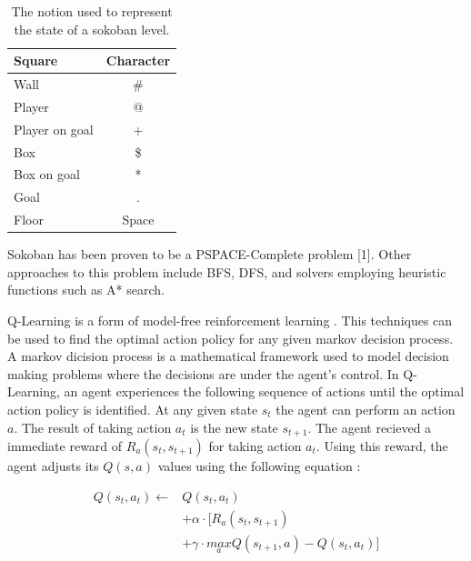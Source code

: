 \documentclass[times, 10pt,twocolumn]{article}
\begin{document}
\begin{table}[htbp]
  \centering
  \begin{tabular}{l c} \hline\hline
    Square & Character \\ \hline
    Wall & \# \\
    Player & @ \\
    Player on goal & + \\
    Box & \$ \\
    Box on goal & * \\
    Goal & . \\
    Floor & Space \\ \hline\hline
  \end{tabular}
  \caption{The notion used to represent the state of a sokoban level.}
  \label{table:notation}
\end{table}


Sokoban has been proven to be a PSPACE-Complete problem [1]. Other approaches to this problem include BFS, DFS, and solvers employing heuristic functions such as A* search.


Q-Learning is a form of model-free reinforcement learning \cite{Watkins1992}. This techniques can be used to find the optimal action policy for any given markov decision process. A markov dicision process is a mathematical framework used to model decision making problems where the decisions are under the agent's control. In Q-Learning, an agent experiences the following sequence of actions until the optimal action policy is identified. At any given state $s_t$ the agent can perform an action $a$. The result of taking action $a_t$ is the new state $s_{t+1}$. The agent recieved a immediate reward of $R_a(s_t, s_{t+1})$ for taking action $a_t$. Using this reward, the agent adjusts its $Q(s, a)$ values using the following equation \cite{Watkins1992}:

\begin{equation}
\label{eq:q}
\begin{split}
Q(s_t, a_t) \gets &Q(s_t, a_t) \\
                  &+ \alpha \cdot [R_a(s_t, s_{t+1}) \\
                  &+ \gamma \cdot \underset{a}{max}Q(s_{t+1}, a) - Q(s_t, a_t)]
\end{split}
\end{equation}
\end{document}

